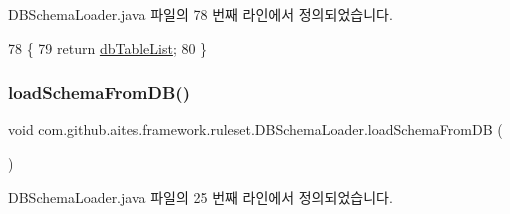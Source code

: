D\+B\+Schema\+Loader.\+java 파일의 78 번째 라인에서 정의되었습니다.


\begin{DoxyCode}
78                                               \{
79         \textcolor{keywordflow}{return} \mbox{\hyperlink{classcom_1_1github_1_1aites_1_1framework_1_1ruleset_1_1_d_b_schema_loader_acacde0e67bd33c28127d235e7fb8aebf}{dbTableList}};
80     \}
\end{DoxyCode}
\mbox{\label{classcom_1_1github_1_1aites_1_1framework_1_1ruleset_1_1_d_b_schema_loader_ad4c037b92081e1f0a9a8dd8ab91147e3}} 
\subsubsection{\texorpdfstring{load\+Schema\+From\+D\+B()}{loadSchemaFromDB()}}
{\footnotesize\ttfamily void com.\+github.\+aites.\+framework.\+ruleset.\+D\+B\+Schema\+Loader.\+load\+Schema\+From\+DB (\begin{DoxyParamCaption}{ }\end{DoxyParamCaption})}



D\+B\+Schema\+Loader.\+java 파일의 25 번째 라인에서 정의되었습니다.


